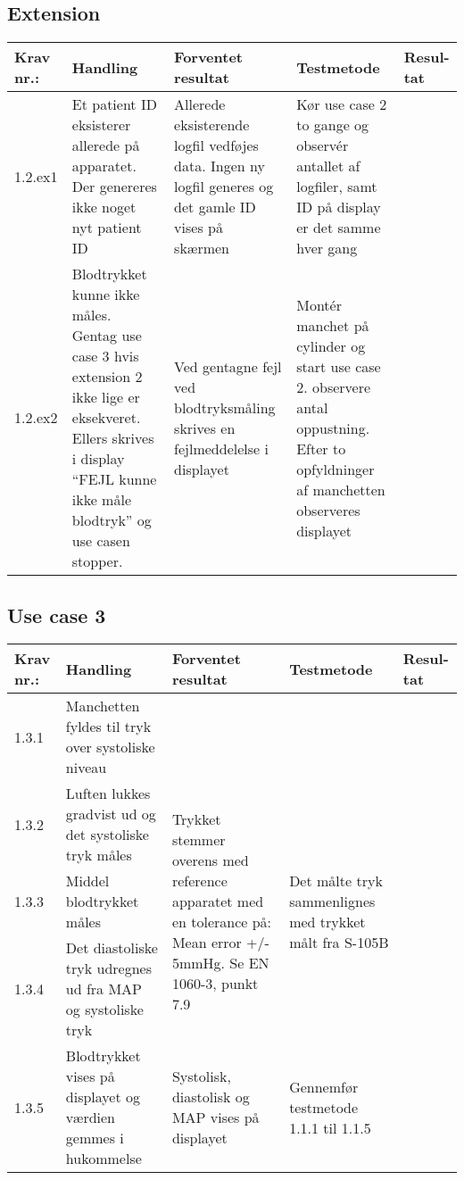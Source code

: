 \documentclass[11pt]{article}
\begin{document}
	\subsection*{Extension}
	\begin{center}
		\begin{longtable}{|p{1.5cm}|p{2cm}|p{3cm}|p{3cm}|p{1.1cm}|}
			\hline
			Krav nr.: & Handling & Forventet resultat & Testmetode & Resul-tat  \\\hline
			1.2.ex1 & Et patient ID eksisterer allerede på apparatet. Der genereres ikke noget nyt patient ID & Allerede eksisterende logfil vedføjes data. Ingen ny logfil generes og det gamle ID vises på skærmen & Kør use case 2 to gange og observér antallet af logfiler, samt ID på display er det samme hver gang &  \\ \hline
			1.2.ex2 & Blodtrykket kunne ikke måles. Gentag use case 3 hvis extension 2 ikke lige er eksekveret. Ellers skrives i display “FEJL kunne ikke måle blodtryk” og use casen stopper.  & Ved gentagne fejl ved blodtryksmåling skrives en fejlmeddelelse i displayet & Montér manchet på cylinder og start use case 2. observere antal oppustning. Efter to opfyldninger af manchetten observeres displayet & \\ \hline
		\end{longtable}
	\end{center}
	
	\pagebreak
			\subsection{Use case 3}
			\begin{center}
				\begin{longtable}{|p{1.5cm}|p{2cm}|p{3cm}|p{3cm}|p{1.1cm}|}
					\hline
					Krav nr.: & Handling & Forventet resultat & Testmetode & Resul-tat  \\\hline
					1.3.1 & Manchetten fyldes til tryk over systoliske niveau & & &  \\ \hline
					1.3.2 & Luften lukkes gradvist ud og det systoliske tryk måles & \multirow{3}{3cm}{Trykket stemmer overens med reference apparatet med en tolerance på: Mean error +/- 5mmHg. Se EN 1060-3, punkt 7.9} & \multirow{3}{3cm}{Det målte tryk sammenlignes med trykket målt fra S-105B} & \multirow{3}{3cm}{}  \\ \cline{1-2} 
					1.3.3 & Middel blodtrykket måles & & & \\ \cline{1-2} 
					1.3.4 &  Det diastoliske tryk udregnes ud fra MAP og systoliske tryk  & & & \\ \hline
					1.3.5 & Blodtrykket vises på displayet og værdien gemmes i hukommelse & Systolisk, diastolisk og MAP vises på displayet & Gennemfør testmetode 1.1.1 til 1.1.5 & \\ \hline
				\end{longtable}
			\end{center}
			
\end{document}
